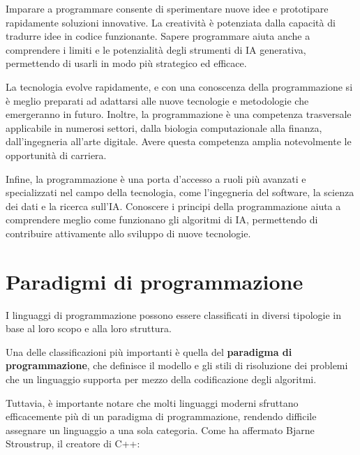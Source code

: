 \documentclass[
  letterpaper,
]{scrbook}
\begin{document}
Imparare a programmare consente di sperimentare nuove idee e prototipare
rapidamente soluzioni innovative. La creatività è potenziata dalla
capacità di tradurre idee in codice funzionante. Sapere programmare
aiuta anche a comprendere i limiti e le potenzialità degli strumenti di
IA generativa, permettendo di usarli in modo più strategico ed efficace.

La tecnologia evolve rapidamente, e con una conoscenza della
programmazione si è meglio preparati ad adattarsi alle nuove tecnologie
e metodologie che emergeranno in futuro. Inoltre, la programmazione è
una competenza trasversale applicabile in numerosi settori, dalla
biologia computazionale alla finanza, dall'ingegneria all'arte digitale.
Avere questa competenza amplia notevolmente le opportunità di carriera.

Infine, la programmazione è una porta d'accesso a ruoli più avanzati e
specializzati nel campo della tecnologia, come l'ingegneria del
software, la scienza dei dati e la ricerca sull'IA. Conoscere i principi
della programmazione aiuta a comprendere meglio come funzionano gli
algoritmi di IA, permettendo di contribuire attivamente allo sviluppo di
nuove tecnologie.

\chapter{Paradigmi di programmazione}\label{paradigmi-di-programmazione}

I linguaggi di programmazione possono essere classificati in diversi
tipologie in base al loro scopo e alla loro struttura.

Una delle classificazioni più importanti è quella del \textbf{paradigma
di programmazione}, che definisce il modello e gli stili di risoluzione
dei problemi che un linguaggio supporta per mezzo della codificazione
degli algoritmi.

Tuttavia, è importante notare che molti linguaggi moderni sfruttano
efficacemente più di un paradigma di programmazione, rendendo difficile
assegnare un linguaggio a una sola categoria. Come ha affermato Bjarne
Stroustrup, il creatore di C++:
\end{document}
